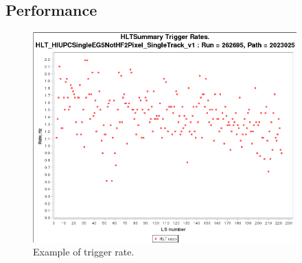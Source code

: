 \subsection{Performance}

\begin{figure}[h!]
\begin{centering}
\includegraphics[width=4in]{Chapter5/importfigs/triggerRateExample.png}
\par\end{centering}
\caption{Example of trigger rate. \label{fig:trigRate}}
\end{figure}